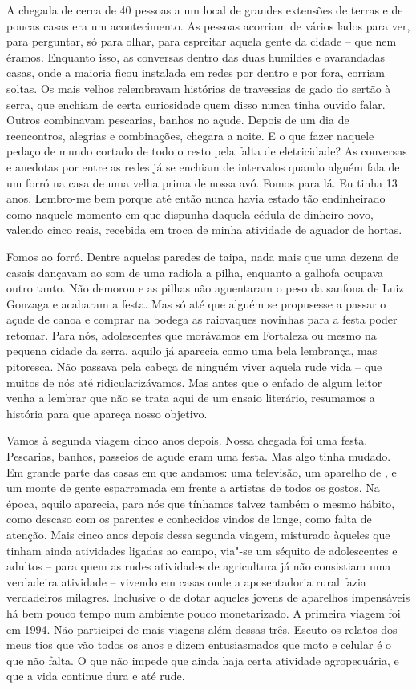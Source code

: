 A chegada de cerca de 40 pessoas a um local de grandes extensões de
terras e de poucas casas era um acontecimento. As pessoas acorriam de
vários lados para ver, para perguntar, só para olhar, para espreitar
aquela gente da cidade -- que nem éramos. Enquanto isso, as conversas
dentro das duas humildes e avarandadas casas, onde a maioria ficou
instalada em redes por dentro e por fora, corriam soltas. Os mais velhos
relembravam histórias de travessias de gado do sertão à serra, que
enchiam de certa curiosidade quem disso nunca tinha ouvido falar. Outros
combinavam pescarias, banhos no açude. Depois de um dia de reencontros,
alegrias e combinações, chegara a noite. E o que fazer naquele pedaço de
mundo cortado de todo o resto pela falta de eletricidade? As conversas e
anedotas por entre as redes já se enchiam de intervalos quando alguém
fala de um forró na casa de uma velha prima de nossa avó. Fomos para lá.
Eu tinha 13 anos. Lembro-me bem porque até então nunca havia estado tão
endinheirado como naquele momento em que dispunha daquela cédula de
dinheiro novo, valendo cinco reais, recebida em troca de minha atividade
de aguador de hortas.

Fomos ao forró. Dentre aquelas paredes de taipa, nada mais que uma dezena de casais
dançavam ao som de uma radiola a pilha, enquanto a galhofa ocupava outro
tanto. Não demorou e as pilhas não aguentaram o peso da sanfona de Luiz
Gonzaga e acabaram a festa. Mas só até que alguém se propusesse a passar
o açude de canoa e comprar na bodega as raiovaques novinhas para a festa
poder retomar. Para nós, adolescentes que morávamos em Fortaleza ou
mesmo na pequena cidade da serra, aquilo já aparecia como uma bela
lembrança, mas pitoresca. Não passava pela cabeça de ninguém viver
aquela rude vida -- que muitos de nós até ridicularizávamos. Mas antes
que o enfado de algum leitor venha a lembrar que não se trata aqui de
um ensaio literário, resumamos a história para que apareça nosso objetivo.

Vamos à segunda viagem cinco anos depois. Nossa chegada foi uma festa.
Pescarias, banhos, passeios de açude eram uma festa. Mas algo tinha
mudado. Em grande parte das casas em que andamos: uma televisão, um
aparelho de , e um monte de gente esparramada em frente a artistas de
todos os gostos. Na época, aquilo aparecia, para nós que tínhamos talvez
também o mesmo hábito, como descaso com os parentes e conhecidos vindos
de longe, como falta de atenção. Mais cinco anos depois dessa segunda
viagem, misturado àqueles que tinham ainda atividades ligadas ao campo,
via"-se um séquito de adolescentes e adultos -- para quem as rudes
atividades de agricultura já não consistiam uma verdadeira atividade --
vivendo em casas onde a aposentadoria rural fazia verdadeiros milagres.
Inclusive o de dotar aqueles jovens de aparelhos impensáveis há bem
pouco tempo num ambiente pouco monetarizado. A primeira viagem foi em
1994. Não participei de mais viagens além dessas três. Escuto os relatos
dos meus tios que vão todos os anos e dizem entusiasmados que moto e
celular é o que não falta. O que não impede que ainda haja certa
atividade agropecuária, e que a vida continue dura e até rude.

